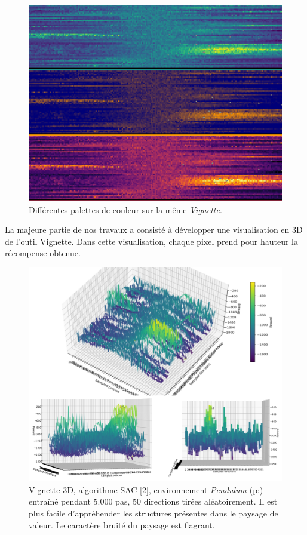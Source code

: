 \documentclass[12pt]{article}
\begin{document}
\begin{figure}[htp]
    \centering
    \includegraphics[width=15cm]{Images/palette}
    \caption{Différentes palettes de couleur sur la même \hyperref[fig:vignettePendulum]{\emph{Vignette}}.}
    \label{fig:palette}
\end{figure}

\newpage
La majeure partie de nos travaux a consisté à développer une visualisation en 3D de l'outil Vignette. Dans cette visualisation, chaque pixel prend pour hauteur la récompense obtenue. \\

\begin{figure}[htp]
    \centering
    \includegraphics[width=15cm]{Images/vignette_3D}
    \caption{Vignette 3D, algorithme SAC [2], environnement \emph{Pendulum} (p:\pageref{second}) entraîné pendant 5.000 pas, 50 directions tirées aléatoirement. Il est plus facile d'appréhender les structures présentes dans le paysage de valeur. Le caractère bruité du paysage est flagrant.}
    \label{fig:vignette3D}
\end{figure}
\end{document}
